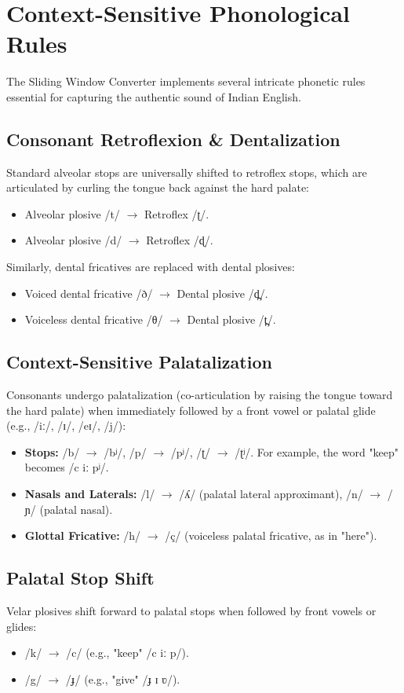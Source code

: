 \section{Context-Sensitive Phonological Rules}
The Sliding Window Converter implements several intricate phonetic rules essential for capturing the authentic sound of Indian English.

\subsection{Consonant Retroflexion \& Dentalization}
Standard alveolar stops are universally shifted to retroflex stops, which are articulated by curling the tongue back against the hard palate:
\begin{itemize}
    \item Alveolar plosive /t/ $\rightarrow$ Retroflex /ʈ/.
    \item Alveolar plosive /d/ $\rightarrow$ Retroflex /ɖ/.
\end{itemize}
Similarly, dental fricatives are replaced with dental plosives:
\begin{itemize}
    \item Voiced dental fricative /ð/ $\rightarrow$ Dental plosive /d̪/.
    \item Voiceless dental fricative /θ/ $\rightarrow$ Dental plosive /t̪/.
\end{itemize}

\subsection{Context-Sensitive Palatalization}
Consonants undergo palatalization (co-articulation by raising the tongue toward the hard palate) when immediately followed by a front vowel or palatal glide (e.g., /iː/, /ɪ/, /eɪ/, /j/):
\begin{itemize}
    \item \textbf{Stops:} /b/ $\rightarrow$ /bʲ/, /p/ $\rightarrow$ /pʲ/, /ʈ/ $\rightarrow$ /ʈʲ/. For example, the word "keep" becomes /c iː pʲ/.
    \item \textbf{Nasals and Laterals:} /l/ $\rightarrow$ /ʎ/ (palatal lateral approximant), /n/ $\rightarrow$ /ɲ/ (palatal nasal).
    \item \textbf{Glottal Fricative:} /h/ $\rightarrow$ /ç/ (voiceless palatal fricative, as in "here").
\end{itemize}

\subsection{Palatal Stop Shift}
Velar plosives shift forward to palatal stops when followed by front vowels or glides:
\begin{itemize}
    \item /k/ $\rightarrow$ /c/ (e.g., "keep" /c iː p/).
    \item /g/ $\rightarrow$ /ɟ/ (e.g., "give" /ɟ ɪ ʋ/).
\end{itemize}


